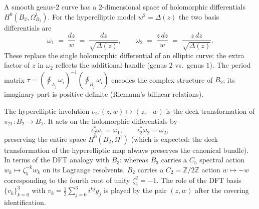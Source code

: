 \begin{remark}
\label{rem:B2-holomorphic-differentials}
A smooth genus-$2$ curve has a $2$-dimensional space of holomorphic
differentials $H^0(B_2, \Omega^1_{B_2})$.  For the hyperelliptic model
$w^2 = \Delta(z)$ the two basis differentials are
\begin{equation}\label{eq:B2-differentials}
  \omega_1 \;=\; \frac{dz}{w}
  \;=\; \frac{dz}{\sqrt{\Delta(z)}},
  \qquad
  \omega_2 \;=\; \frac{z\,dz}{w}
  \;=\; \frac{z\,dz}{\sqrt{\Delta(z)}}.
\end{equation}
These replace the single holomorphic differential of an elliptic curve;
the extra factor of $z$ in $\omega_2$ reflects the additional handle
(genus $2$ vs.\ genus $1$).  The period matrix
$\tau = (\oint_{A_j}\omega_i)^{-1}(\oint_{B_j}\omega_i)$ encodes the
complex structure of $B_2$; its imaginary part is positive definite
(Riemann's bilinear relations).
\end{remark}

\begin{remark}
\label{rem:B2-deck-transformation}
The hyperelliptic involution
$\iota_2\colon (z,w) \mapsto (z,-w)$
is the deck transformation of $\pi_{21}\colon B_2\to B_1$.  It acts on
the holomorphic differentials by
\[
  \iota_2^*\omega_1 = \omega_1,
  \qquad
  \iota_2^*\omega_2 = \omega_2,
\]
preserving the entire space $H^0(B_2,\Omega^1)$ (which is expected:
the deck transformation of the hyperelliptic map always preserves
the canonical bundle).  In terms of the DFT analogy with $B_3$:
whereas $B_3$ carries a $C_5$ spectral action
$w_k\mapsto\zeta_5^{-k}w_k$ on its Lagrange resolvents, $B_2$ carries a
$C_2 = \mathbb{Z}/2\mathbb{Z}$ action $w\mapsto -w$ corresponding to
the fourth root of unity $\zeta_4^2 = -1$.  The role of the DFT basis
$\{v_k\}_{k=0}^{3}$ with $v_k = \tfrac{1}{2}\sum_{j=0}^{3}i^{kj}y_j$
is played by the pair $(z, w)$ after the covering identification.
\end{remark}

